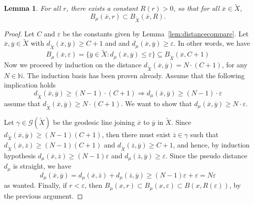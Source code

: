 \documentclass[12pt,article]{amsart}
\numberwithin{equation}{section}
\numberwithin{figure}{section}
\newtheorem{lemma}[equation]{Lemma}
\theoremstyle{definition}
\theoremstyle{plain}
\newcommand\N{\ensuremath{\mathbb{N}}}
\newcommand*{\wt}[1]{\widetilde{#1}}
\renewcommand{\epsilon}{\varepsilon}
\begin{document}
\begin{lemma}
For all $r$, there exists a constant $R(r)>0$, 
so that for all $\overline{x} \in \wt{X}$,
\[
B_{\mu}(\overline{x},r) \subset B_{\wt{X}}(\overline{x},R).
\]
\label{lem:balls}
\end{lemma}
\begin{proof}
Let $C$ and $\epsilon$ be the constants given by Lemma~\ref{lem:distancecompare}. Let $\overline{x},\overline{y} \in \wt{X}$ with $d_{\wt{X}} (\overline{x},\overline{y}) \geq C +1$ and and $d_\mu (\overline{x},\overline{y}) \geq \epsilon$. In other words, we have
\[
B_\mu (\overline{x}, \epsilon) = \{ \overline{y} \in \wt{X} \colon d_\mu (\overline{x}, \overline{y}) \leq \epsilon \} \subseteq B_{\wt{X}} (\overline{x}, C+1)
\]
Now we proceed by induction on the distance $d_{\wt{X}} (\overline{x},\overline{y}) = N \cdot (C +1)$, for any $N \in \N$. The induction basis has been proven already. Assume that the following implication holds
\[
d_{\wt{X}} (\overline{x},\overline{y}) \geq (N-1) \cdot (C +1) \Rightarrow d_\mu (\overline{x},\overline{y}) \geq (N-1) \cdot \epsilon
\]
assume that $d_{\wt{X}} (\overline{x},\overline{y}) \geq N \cdot (C +1)$. We want to show that $d_\mu (\overline{x},\overline{y}) \geq N \cdot \epsilon$.

Let $\gamma \in \mathcal{G}({{\wt{X}}})$ be the geodesic line joining $\overline{x}$ to $\overline{y}$ in ${\wt{X}}$. Since $d_{\wt{X}} (\overline{x},\overline{y}) \geq (N-1) (C+1)$, then there must exist $\overline{z} \in \gamma$ such that $d_{\wt{X}} (\overline{x},\overline{z}) \geq (N-1) (C+1)$ and $d_{\wt{X}} (\overline{z}, \overline{y}) \geq C+1$, and hence, by induction hypothesis $d_\mu (\overline{x},\overline{z}) \geq (N-1)\epsilon$ and $d_\mu(\overline{z},\overline{y}) \geq \epsilon$.
Since the pseudo distance $d_\mu$ is straight, we have
\[
    d_\mu (\overline{x}, \overline{y}) = d_\mu (\overline{x}, \overline{z}) + d_\mu (\overline{z},\overline{y}) \geq (N-1)\epsilon +\epsilon = N \epsilon
\]
as wanted.
Finally, if $r < \epsilon$, then $B_{\mu}(x,r) \subset B_{\mu}(x,\epsilon) \subset B(x,R(\epsilon))$, by the previous argument.
\end{proof}
\end{document}
